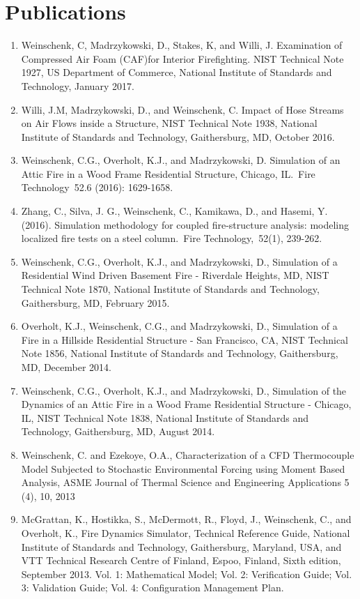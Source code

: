 \documentclass[10pt,letterpaper]{article}
\begin{document}
\clearpage

\section*{Publications}
\begin{enumerate}
\item Weinschenk, C, Madrzykowski, D., Stakes, K, and Willi, J. Examination of Compressed Air Foam (CAF)for Interior Firefighting. NIST Technical Note 1927, US Department of Commerce, National Institute of Standards and Technology, January 2017.
\item Willi, J.M, Madrzykowski, D., and Weinschenk, C. Impact of Hose Streams on Air Flows inside a
Structure, NIST Technical Note 1938, National Institute of Standards and Technology, Gaithersburg, MD, October 2016.
\item Weinschenk, C.G., Overholt, K.J., and Madrzykowski, D. Simulation of an Attic Fire in a Wood Frame Residential Structure, Chicago, IL. Fire Technology 52.6 (2016): 1629-1658.
\item Zhang, C., Silva, J. G., Weinschenk, C., Kamikawa, D., and Hasemi, Y. (2016). Simulation methodology for coupled fire-structure analysis: modeling localized fire tests on a steel column. Fire Technology, 52(1), 239-262.
\item Weinschenk, C.G., Overholt, K.J., and Madrzykowski, D., Simulation of a Residential Wind Driven Basement Fire - Riverdale Heights, MD, NIST Technical Note 1870, National Institute of Standards and Technology, Gaithersburg, MD, February 2015.
\item Overholt, K.J., Weinschenk, C.G., and Madrzykowski, D., Simulation of a Fire in a Hillside Residential Structure - San Francisco, CA, NIST Technical Note 1856, National Institute of Standards and Technology, Gaithersburg, MD, December 2014.
\item Weinschenk, C.G., Overholt, K.J., and Madrzykowski, D., Simulation of the Dynamics of an Attic Fire in a Wood Frame Residential Structure - Chicago, IL, NIST Technical Note 1838, National Institute of Standards and Technology, Gaithersburg, MD, August 2014.
\item  Weinschenk, C. and Ezekoye, O.A., Characterization of a CFD Thermocouple Model Subjected to Stochastic Environmental Forcing using Moment Based Analysis, ASME Journal of Thermal Science and Engineering Applications 5 (4), 10, 2013
\item McGrattan, K., Hostikka, S., McDermott, R., Floyd, J., Weinschenk, C., and Overholt, K., Fire Dynamics Simulator, Technical Reference Guide, National Institute of Standards and Technology, Gaithersburg, Maryland, USA, and VTT Technical Research Centre of Finland, Espoo, Finland, Sixth edition, September 2013. Vol. 1: Mathematical Model; Vol. 2: Verification Guide; Vol. 3: Validation Guide; Vol. 4: Configuration Management Plan.

\end{enumerate}
\end{document}
